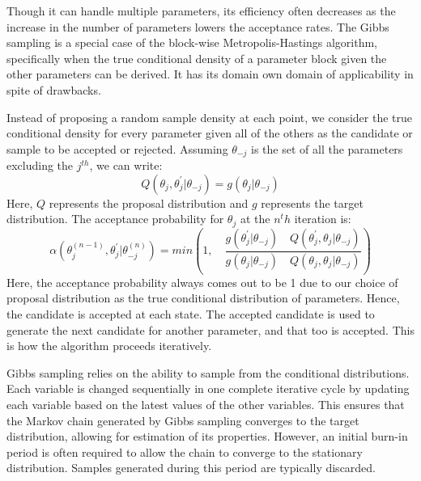 \documentclass{article}
\begin{document}
Though it can handle multiple parameters, its efficiency often decreases as the increase in the number of parameters lowers the acceptance rates. The Gibbs sampling is a special case of the block-wise Metropolis-Hastings algorithm, specifically when the true conditional density of a parameter block given the other parameters can be derived. It has its domain own domain of applicability in spite of drawbacks. 

Instead of proposing a random sample density at each point, we consider the true conditional density for every parameter given all of the others as the candidate or sample to be accepted or rejected. Assuming $\theta_{-j}$ is the set of all the parameters excluding the $j^{th}$, we can write:
\begin{equation}
Q(\theta_j,\theta^{'}_j|\theta_{-j}) = g(\theta_j|\theta_{-j}) \nonumber
\end{equation}
Here, $Q$ represents the proposal distribution and $g$ represents the target distribution. The acceptance probability for $\theta_j$ at the $n^th$ iteration is: 
\begin{equation}
\alpha (\theta^{(n-1)}_j,\theta^{'}_j|\theta^{(n)}_{-j}) = min \left( 1, \quad \frac{g(\theta^{'}_j|\theta_{-j}) \quad Q(\theta^{'}_j,\theta_j|\theta_{-j})}{g(\theta_j|\theta_{-j}) \quad Q(\theta_j,\theta_j|\theta_{-j})} \right) \label{eq:gibbssamp}
\end{equation}
Here, the acceptance probability always comes out to be 1 due to our choice of proposal distribution as the true conditional distribution of parameters. Hence, the candidate is accepted at each state. The accepted candidate is used to generate the next candidate for another parameter, and that too is accepted. This is how the algorithm proceeds iteratively. 

Gibbs sampling relies on the ability to sample from the conditional distributions. Each variable is changed sequentially in one complete iterative cycle by updating each variable based on the latest values of the other variables. This ensures that the Markov chain generated by Gibbs sampling converges to the target distribution, allowing for estimation of its properties. However, an initial burn-in period is often required to allow the chain to converge to the stationary distribution. Samples generated during this period are typically discarded.
\end{document}
